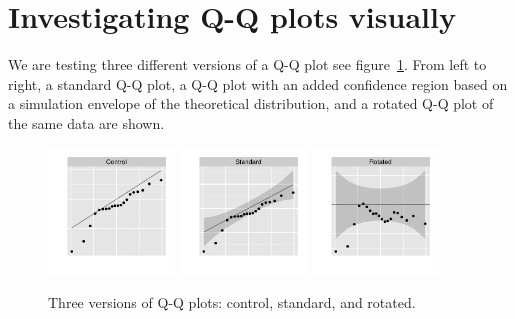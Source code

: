 \documentclass{article} %
\begin{document}
\section{Investigating Q-Q plots visually}

We are testing three different versions of a Q-Q plot %
see figure~\ref{qqplots}. From left to right, a standard Q-Q plot, a Q-Q plot with an added confidence region based on a simulation envelope of the theoretical distribution, and a rotated Q-Q plot of the same data are shown. 

\begin{figure}
\centering
\includegraphics[width=0.3\textwidth]{qqplots1}
\includegraphics[width=0.3\textwidth]{qqplots2}
\includegraphics[width=0.3\textwidth]{qqplots3}
\caption{ \label{qqplots} Three versions of Q-Q plots: control, standard, and rotated.}
\end{figure}
\end{document}
